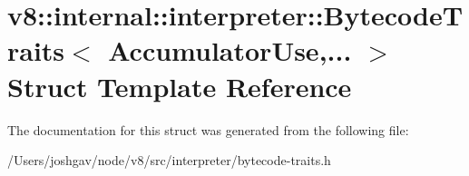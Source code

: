 \hypertarget{structv8_1_1internal_1_1interpreter_1_1_bytecode_traits}{}\section{v8\+:\+:internal\+:\+:interpreter\+:\+:Bytecode\+Traits$<$ Accumulator\+Use,... $>$ Struct Template Reference}
\label{structv8_1_1internal_1_1interpreter_1_1_bytecode_traits}


The documentation for this struct was generated from the following file\+:\begin{DoxyCompactItemize}
\item 
/\+Users/joshgav/node/v8/src/interpreter/bytecode-\/traits.\+h\end{DoxyCompactItemize}
